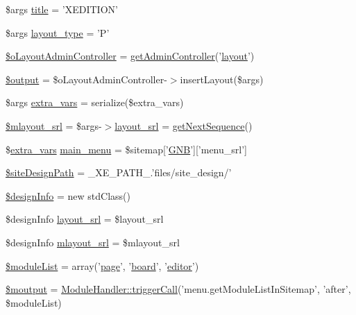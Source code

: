 \begin{DoxyCompactItemize}
\$args \hyperlink{ko_8install_8php_a5b072c5fd1d2228c6ba5cee13cd142e3}{title} = 'X\-E\-D\-I\-T\-I\-O\-N'
\item 
\$args \hyperlink{ko_8install_8php_a0532d89570cfdaebc628afac2ff5a81b}{layout\-\_\-type} = 'P'
\item 
\hyperlink{ko_8install_8php_a6a03496003da7df71cf94d9accb430be}{\$o\-Layout\-Admin\-Controller} = \hyperlink{func_8inc_8php_a2f7ca88a5226536aca3b2f5682bd7b2d}{get\-Admin\-Controller}('\hyperlink{classlayout}{layout}')
\item 
\hyperlink{ko_8install_8php_a73004ce9cd673c1bfafd1dc351134797}{\$output} = \$o\-Layout\-Admin\-Controller-\/$>$insert\-Layout(\$args)
\item 
\$args \hyperlink{ko_8install_8php_ae1dcb37fc34a8f312d2e6abd6f806743}{extra\-\_\-vars} = serialize(\$extra\-\_\-vars)
\item 
\hyperlink{ko_8install_8php_a576210f0eec2e42df2c40e04a3972bb0}{\$mlayout\-\_\-srl} = \$args-\/$>$\hyperlink{ko_8install_8php_a70054876db09b2519a1726663c8dd9e7}{layout\-\_\-srl} = \hyperlink{func_8inc_8php_a5a97b458f9c5b4fe3574671840aee27c}{get\-Next\-Sequence}()
\item 
\$\hyperlink{ko_8install_8php_ae1dcb37fc34a8f312d2e6abd6f806743}{extra\-\_\-vars} \hyperlink{ko_8install_8php_ac71104c770b8ced3891f35849d3f2906}{main\-\_\-menu} = \$sitemap\mbox{[}'\hyperlink{ko_8install_8php_a9b1716b68fc04f3492448f38148dcbf5}{G\-N\-B}'\mbox{]}\mbox{[}'menu\-\_\-srl'\mbox{]}
\item 
\hyperlink{ko_8install_8php_a0b79a974b91157b79d83cc0be7e3247c}{\$site\-Design\-Path} = \-\_\-\-X\-E\-\_\-\-P\-A\-T\-H\-\_\-.'files/site\-\_\-design/'
\item 
\hyperlink{ko_8install_8php_a99e144f7d563ceb76b003d54739b3b0c}{\$design\-Info} = new std\-Class()
\item 
\$design\-Info \hyperlink{ko_8install_8php_a70054876db09b2519a1726663c8dd9e7}{layout\-\_\-srl} = \$layout\-\_\-srl
\item 
\$design\-Info \hyperlink{ko_8install_8php_a9cf497537007b08c645bed35f564be54}{mlayout\-\_\-srl} = \$mlayout\-\_\-srl
\item 
\hyperlink{ko_8install_8php_aaa80946d50e2d3677fbbc6d6c8a643c3}{\$module\-List} = array('\hyperlink{classpage}{page}', '\hyperlink{classboard}{board}', '\hyperlink{classeditor}{editor}')
\item 
\hyperlink{ko_8install_8php_a2598d068355cca17645bc6bd70cc3a8c}{\$moutput} = \hyperlink{classModuleHandler_aa1b1f9eae91ccd76e6a81c9375c2e673}{Module\-Handler\-::trigger\-Call}('menu.\-get\-Module\-List\-In\-Sitemap', 'after', \$module\-List)

\end{DoxyCompactItemize}
